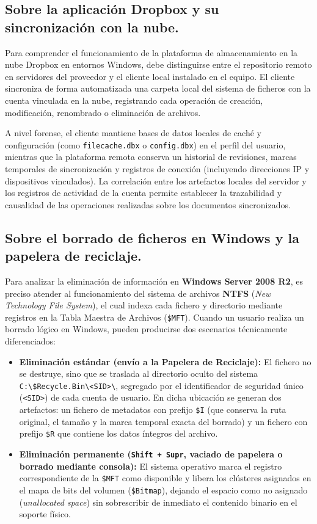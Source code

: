 \subsection{Sobre la aplicación Dropbox y su sincronización con la nube.}
Para comprender el funcionamiento de la plataforma de almacenamiento en la nube Dropbox en entornos Windows, debe distinguirse entre el repositorio remoto en servidores del proveedor y el cliente local instalado en el equipo. El cliente sincroniza de forma automatizada una carpeta local del sistema de ficheros con la cuenta vinculada en la nube, registrando cada operación de creación, modificación, renombrado o eliminación de archivos.

A nivel forense, el cliente mantiene bases de datos locales de caché y configuración (como \texttt{filecache.dbx} o \texttt{config.dbx}) en el perfil del usuario, mientras que la plataforma remota conserva un historial de revisiones, marcas temporales de sincronización y registros de conexión (incluyendo direcciones IP y dispositivos vinculados). La correlación entre los artefactos locales del servidor y los registros de actividad de la cuenta permite establecer la trazabilidad y causalidad de las operaciones realizadas sobre los documentos sincronizados.

\subsection{Sobre el borrado de ficheros en Windows y la papelera de reciclaje.}
Para analizar la eliminación de información en \textbf{Windows Server 2008 R2}, es preciso atender al funcionamiento del sistema de archivos \textbf{NTFS} (\textit{New Technology File System}), el cual indexa cada fichero y directorio mediante registros en la Tabla Maestra de Archivos (\texttt{\$MFT}). Cuando un usuario realiza un borrado lógico en Windows, pueden producirse dos escenarios técnicamente diferenciados:

\begin{itemize}[leftmargin=1.5em]
	\item \textbf{Eliminación estándar (envío a la Papelera de Reciclaje):} El fichero no se destruye, sino que se traslada al directorio oculto del sistema \texttt{C:\textbackslash \$Recycle.Bin\textbackslash <SID>\textbackslash}, segregado por el identificador de seguridad único (\texttt{<SID>}) de cada cuenta de usuario. En dicha ubicación se generan dos artefactos: un fichero de metadatos con prefijo \texttt{\$I} (que conserva la ruta original, el tamaño y la marca temporal exacta del borrado) y un fichero con prefijo \texttt{\$R} que contiene los datos íntegros del archivo.
	\item \textbf{Eliminación permanente (\texttt{Shift + Supr}, vaciado de papelera o borrado mediante consola):} El sistema operativo marca el registro correspondiente de la \texttt{\$MFT} como disponible y libera los clústeres asignados en el mapa de bits del volumen (\texttt{\$Bitmap}), dejando el espacio como no asignado (\textit{unallocated space}) sin sobrescribir de inmediato el contenido binario en el soporte físico.
\end{itemize}

